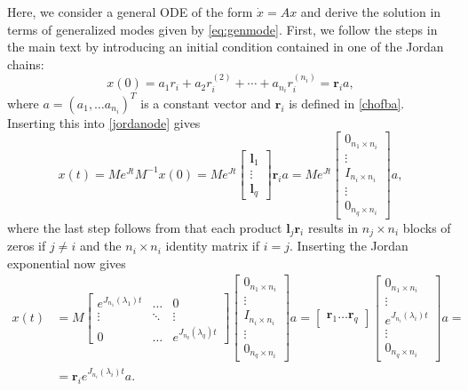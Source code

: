 \documentclass[../main.tex]{subfiles}
\begin{document}
Here, we consider a general ODE of the form $\dot x = Ax$ and derive the solution in terms of generalized modes given by \cref{eq:genmode}. First, we follow the steps in the main text by introducing an initial condition contained in one of the Jordan chains:
\begin{equation}\label{eq:appini}
    x(0) = a_1r_i + a_2r_i^{(2)} + \cdots + a_{n_i}r_i^{(n_i)} = \boldsymbol{r}_ia,
\end{equation}
where $a = (a_1, \dots a_{n_i})^T$ is a constant vector and $\boldsymbol{r}_i$ is defined in \cref{chofba}. Inserting this into \cref{jordanode} gives
\begin{equation}\label{eq:appyo}
    x(t) = Me^{Jt}M^{-1}x(0) = Me^{Jt} \begin{bmatrix} \boldsymbol{l}_1 \\ \vdots \\ \boldsymbol{l}_{q} \end{bmatrix} \boldsymbol{r}_ia = Me^{Jt}\begin{bmatrix} 0_{n_1\times n_i} \\ \vdots \\ I_{n_i\times n_i} \\ \vdots \\ 0_{n_q\times n_i}\end{bmatrix}a,
\end{equation}
where the last step follows from that each product $\boldsymbol{l}_j\boldsymbol{r}_i$ results in $n_j\times n_i$ blocks of zeros if $j\neq i$ and the $n_i\times n_i$ identity matrix if $i=j$. Inserting the Jordan exponential now gives
\begin{equation}\label{eq:appone}
    \begin{aligned}
        x(t) &= M \begin{bmatrix}e^{J_{n_1}(\lambda_1)t} & \dots & 0 \\
                            \vdots & \ddots & \vdots \\
                            0 & \dots &  e^{J_{n_q}(\lambda_q)t}\end{bmatrix}
            \begin{bmatrix} 0_{n_1\times n_i} \\ \vdots \\ I_{n_i\times n_i} \\ \vdots \\ 0_{n_q\times n_i}\end{bmatrix}a = \begin{bmatrix}\boldsymbol{r}_1 \dots \boldsymbol{r}_q\end{bmatrix} \begin{bmatrix} 0_{n_1\times n_i} \\ \vdots \\ e^{J_{n_i}(\lambda_i)t} \\ \vdots \\ 0_{n_q\times n_i}\end{bmatrix}a =\\&= \boldsymbol{r}_ie^{J_{n_i}(\lambda_i)t}a.
    \end{aligned}
\end{equation}
\end{document}
